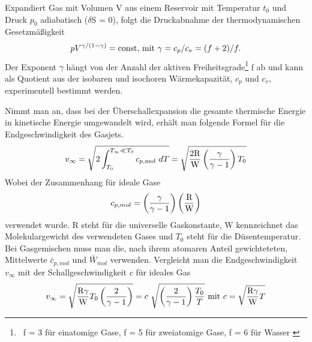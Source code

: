 %
Expandiert Gas mit Volumen V aus einem Reservoir mit Temperatur $t_0$ und Druck $p_0$ adiabatisch ($\delta$S = 0), folgt die Druckabnahme der thermodynamischen Gesetzmäßigkeit
\begin{equation}
pV^{\gamma/(1-\gamma)} = \textmd{const, mit}\ \gamma=c_p/c_v=(f+2)/f .
\end{equation}
%
Der Exponent $\gamma$ hängt von der Anzahl der aktiven Freiheitsgrade\footnote{\ f = 3 für einatomige Gase, f = 5 für zweiatomige Gase, f = 6 für Wasser \cite{mul13}} f ab und kann als Quotient aus der isobaren und isochoren Wärmekapazität, $c_p$ und $c_v$, experimentell bestimmt werden. 

Nimmt man an, dass bei der Überschallexpansion die gesamte thermische Energie in kinetische Energie umgewandelt wird, erhält man folgende Formel für die Endgeschwindigkeit des Gasjets.
\begin{equation}
v_\infty=\sqrt{2\int_{T_0}^{T_\infty \ll T_0} c_{p,{\tiny \textmd{mol}}}\ dT}= \sqrt{\frac{2\textmd{R}}{\textmd{W}}\left(\frac{\gamma}{\gamma-1}\right)T_0}
\end{equation}
%
Wobei der Zusammenhang für ideale Gase
\begin{equation}
c_{p,mol}= \left(\frac{\gamma}{\gamma-1}\right)\left(\frac{\textmd{R}}{\textmd{W}}\right)
\end{equation}
%
verwendet wurde. R steht für die universelle Gaskonstante, W kennzeichnet das Molekulargewicht des verwendeten Gases und $T_0$ steht für die Düsentemperatur.
Bei Gasgemischen muss man die, nach ihrem atomaren Anteil gewichteteten, Mittelwerte $\bar{c}_{p,mol}$ und $\bar{W}_{mol}$ verwenden.
Vergleicht man die Endgeschwindigkeit $v_{\infty}$ mit der Schallgeschwindigkeit $c$ für ideales Gas
\begin{equation}
v_\infty= \sqrt{\frac{\textmd{R}\gamma}{\textmd{W}}T_0\left(\frac{2}{\gamma-1}\right)} = c\ \sqrt{\left(\frac{2}{\gamma-1}\right)\frac{T_0}{T}} \textmd{ mit } c=\sqrt{\frac{\textmd{R} \gamma}{\textmd{W}}T}
\end{equation}

